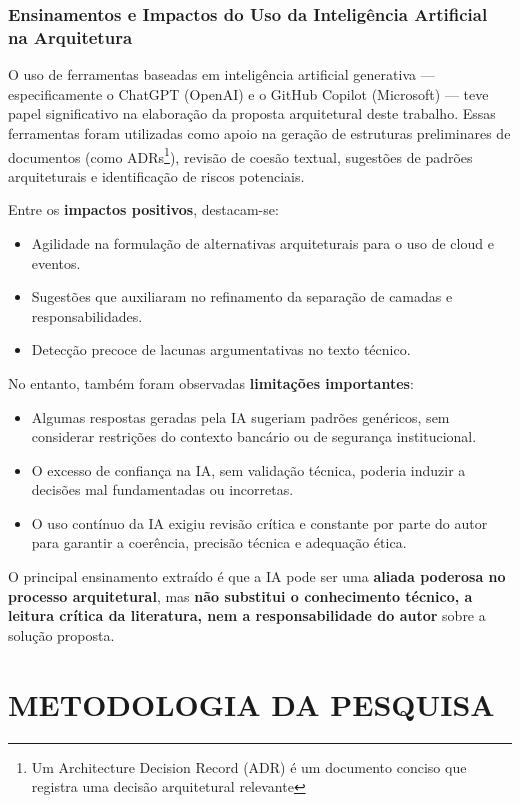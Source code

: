 \subsection{Ensinamentos e Impactos do Uso da Inteligência Artificial na Arquitetura}

O uso de ferramentas baseadas em inteligência artificial generativa — especificamente o ChatGPT (OpenAI) e o GitHub Copilot (Microsoft) — teve papel significativo na elaboração da proposta arquitetural deste trabalho. Essas ferramentas foram utilizadas como apoio na geração de estruturas preliminares de documentos (como ADRs\footnote{Um Architecture Decision Record (ADR) é um documento conciso que registra uma decisão arquitetural relevante}), revisão de coesão textual, sugestões de padrões arquiteturais e identificação de riscos potenciais.

Entre os \textbf{impactos positivos}, destacam-se:
\begin{itemize}
	\item Agilidade na formulação de alternativas arquiteturais para o uso de cloud e eventos.
	\item Sugestões que auxiliaram no refinamento da separação de camadas e responsabilidades.
	\item Detecção precoce de lacunas argumentativas no texto técnico.
\end{itemize}

No entanto, também foram observadas \textbf{limitações importantes}:
\begin{itemize}
	\item Algumas respostas geradas pela IA sugeriam padrões genéricos, sem considerar restrições do contexto bancário ou de segurança institucional.
	\item O excesso de confiança na IA, sem validação técnica, poderia induzir a decisões mal fundamentadas ou incorretas.
	\item O uso contínuo da IA exigiu revisão crítica e constante por parte do autor para garantir a coerência, precisão técnica e adequação ética.
\end{itemize}

O principal ensinamento extraído é que a IA pode ser uma \textbf{aliada poderosa no processo arquitetural}, mas \textbf{não substitui o conhecimento técnico, a leitura crítica da literatura, nem a responsabilidade do autor} sobre a solução proposta.

\chapter{METODOLOGIA DA PESQUISA}

